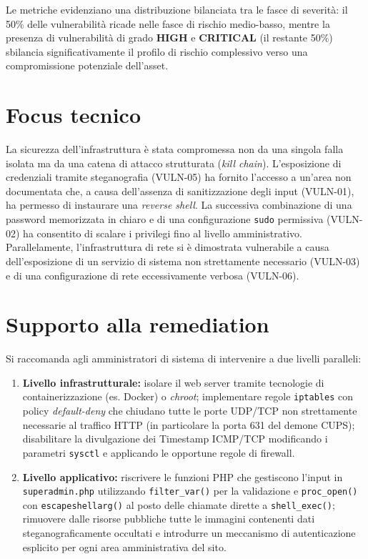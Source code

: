 \documentclass[11pt]{report}
\begin{document}
	\vspace{0.5cm}
	Le metriche evidenziano una distribuzione bilanciata tra le fasce di severità: il 50\% delle vulnerabilità ricade nelle fasce di rischio medio-basso, mentre la presenza di vulnerabilità di grado \textbf{HIGH} e \textbf{CRITICAL} (il restante 50\%) sbilancia significativamente il profilo di rischio complessivo verso una compromissione potenziale dell'asset.
	
	\section{Focus tecnico}
	La sicurezza dell'infrastruttura è stata compromessa non da una singola falla isolata ma da una catena di attacco strutturata (\textit{kill chain}). L'esposizione di credenziali tramite steganografia (VULN-05) ha fornito l'accesso a un'area non documentata che, a causa dell'assenza di sanitizzazione degli input (VULN-01), ha permesso di instaurare una \textit{reverse shell}. La successiva combinazione di una password memorizzata in chiaro e di una configurazione \texttt{sudo} permissiva (VULN-02) ha consentito di scalare i privilegi fino al livello amministrativo. Parallelamente, l'infrastruttura di rete si è dimostrata vulnerabile a causa dell'esposizione di un servizio di sistema non strettamente necessario (VULN-03) e di una configurazione di rete eccessivamente verbosa (VULN-06).
	
	\section{Supporto alla remediation}
	Si raccomanda agli amministratori di sistema di intervenire a due livelli paralleli:
	\begin{enumerate}
		\item \textbf{Livello infrastrutturale:} isolare il web server tramite tecnologie di containerizzazione (es. Docker) o \textit{chroot}; implementare regole \texttt{iptables} con policy \textit{default-deny} che chiudano tutte le porte UDP/TCP non strettamente necessarie al traffico HTTP (in particolare la porta 631 del demone CUPS); disabilitare la divulgazione dei Timestamp ICMP/TCP modificando i parametri \texttt{sysctl} e applicando le opportune regole di firewall.
		\item \textbf{Livello applicativo:} riscrivere le funzioni PHP che gestiscono l'input in \texttt{superadmin.php} utilizzando \texttt{filter\_var()} per la validazione e \texttt{proc\_open()} con \texttt{escapeshellarg()} al posto delle chiamate dirette a \texttt{shell\_exec()}; rimuovere dalle risorse pubbliche tutte le immagini contenenti dati steganograficamente occultati e introdurre un meccanismo di autenticazione esplicito per ogni area amministrativa del sito.
	\end{enumerate}
	
\end{document}
